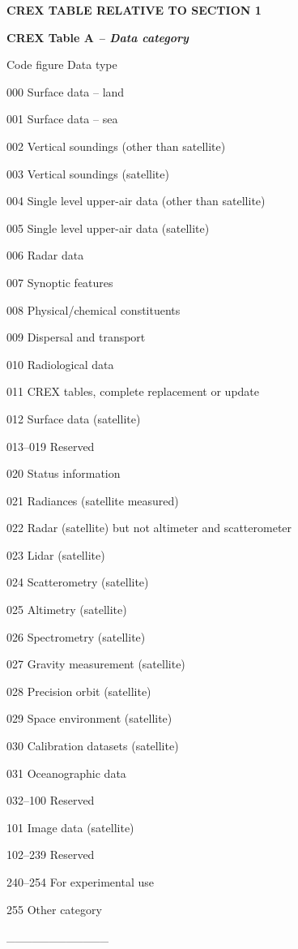 \textbf{CREX TABLE RELATIVE TO SECTION 1}

\textbf{CREX Table A \emph{-- Data category}}

Code figure Data type

000 Surface data -- land

001 Surface data -- sea

002 Vertical soundings (other than satellite)

003 Vertical soundings (satellite)

004 Single level upper-air data (other than satellite)

005 Single level upper-air data (satellite)

006 Radar data

007 Synoptic features

008 Physical/chemical constituents

009 Dispersal and transport

010 Radiological data

011 CREX tables, complete replacement or update

012 Surface data (satellite)

013--019 Reserved

020 Status information

021 Radiances (satellite measured)

022 Radar (satellite) but not altimeter and scatterometer

023 Lidar (satellite)

024 Scatterometry (satellite)

025 Altimetry (satellite)

026 Spectrometry (satellite)

027 Gravity measurement (satellite)

028 Precision orbit (satellite)

029 Space environment (satellite)

030 Calibration datasets (satellite)

031 Oceanographic data

032--100 Reserved

101 Image data (satellite)

102--239 Reserved

240--254 For experimental use

255 Other category

\_\_\_\_\_\_\_\_\_\_\_\_
